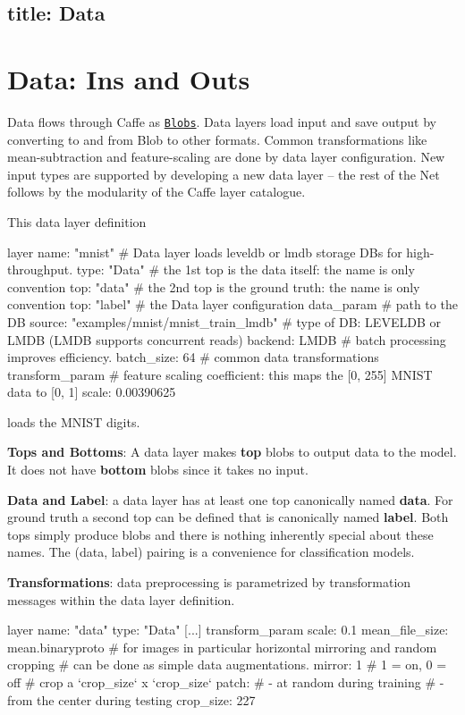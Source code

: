 

 \subsection*{title\+: Data }

\section*{Data\+: Ins and Outs}

Data flows through Caffe as \href{net_layer_blob.html#blob-storage-and-communication}{\tt Blobs}. Data layers load input and save output by converting to and from Blob to other formats. Common transformations like mean-\/subtraction and feature-\/scaling are done by data layer configuration. New input types are supported by developing a new data layer -- the rest of the Net follows by the modularity of the Caffe layer catalogue.

This data layer definition \begin{DoxyVerb}layer {
  name: "mnist"
  # Data layer loads leveldb or lmdb storage DBs for high-throughput.
  type: "Data"
  # the 1st top is the data itself: the name is only convention
  top: "data"
  # the 2nd top is the ground truth: the name is only convention
  top: "label"
  # the Data layer configuration
  data_param {
    # path to the DB
    source: "examples/mnist/mnist_train_lmdb"
    # type of DB: LEVELDB or LMDB (LMDB supports concurrent reads)
    backend: LMDB
    # batch processing improves efficiency.
    batch_size: 64
  }
  # common data transformations
  transform_param {
    # feature scaling coefficient: this maps the [0, 255] MNIST data to [0, 1]
    scale: 0.00390625
  }
}
\end{DoxyVerb}


loads the M\+N\+I\+ST digits.

{\bfseries Tops and Bottoms}\+: A data layer makes {\bfseries top} blobs to output data to the model. It does not have {\bfseries bottom} blobs since it takes no input.

{\bfseries Data and Label}\+: a data layer has at least one top canonically named {\bfseries data}. For ground truth a second top can be defined that is canonically named {\bfseries label}. Both tops simply produce blobs and there is nothing inherently special about these names. The (data, label) pairing is a convenience for classification models.

{\bfseries Transformations}\+: data preprocessing is parametrized by transformation messages within the data layer definition. \begin{DoxyVerb}layer {
  name: "data"
  type: "Data"
  [...]
  transform_param {
    scale: 0.1
    mean_file_size: mean.binaryproto
    # for images in particular horizontal mirroring and random cropping
    # can be done as simple data augmentations.
    mirror: 1  # 1 = on, 0 = off
    # crop a `crop_size` x `crop_size` patch:
    # - at random during training
    # - from the center during testing
    crop_size: 227
  }
}
\end{DoxyVerb}


